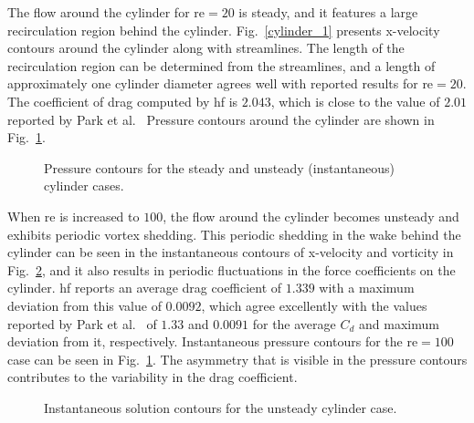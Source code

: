 The flow around the cylinder for \gls{re}$= 20$ is steady, and it features a large recirculation region behind the cylinder. Fig.~\ref{cylinder_1} presents x-velocity contours around the cylinder along with streamlines. The length of the recirculation region can be determined from the streamlines, and a length of approximately one cylinder diameter agrees well with reported results for \gls{re}$= 20$. The coefficient of drag computed by \gls{hf} is $2.043$, which is close to the value of $2.01$ reported by Park et al.~\cite{park1998} Pressure contours around the cylinder are shown in Fig.~\ref{cylinder_2}.

\begin{figure}


  \caption{Pressure contours for the steady and unsteady (instantaneous) cylinder cases.}
  \label{cylinder_2}
\end{figure}

When \gls{re} is increased to $100$, the flow around the cylinder becomes unsteady and exhibits periodic vortex shedding. This periodic shedding in the wake behind the cylinder can be seen in the instantaneous contours of x-velocity and vorticity in Fig.~\ref{cylinder_3}, and it also results in periodic fluctuations in the force coefficients on the cylinder. \gls{hf} reports an average drag coefficient of $1.339$ with a maximum deviation from this value of $0.0092$, which agree excellently with the values reported by Park et al.~\cite{park1998} of $1.33$ and $0.0091$ for the average $C_d$ and maximum deviation from it, respectively.  Instantaneous pressure contours for the \gls{re}$= 100$ case can be seen in Fig.~\ref{cylinder_2}. The asymmetry that is visible in the pressure contours contributes to the variability in the drag coefficient.

\begin{figure}

  \caption{Instantaneous solution contours for the unsteady cylinder case.}
  \label{cylinder_3}
\end{figure}